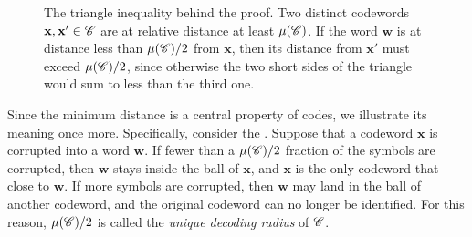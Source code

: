 \documentclass[../../book]{subfiles}
\begin{document}
\begin{figure}[ht]
    \centering
    \caption{The triangle inequality behind the proof. Two distinct codewords $\mathbf{x}, \mathbf{x}' \in \mathscr{C}$ are at relative distance at least $\mu(\mathscr{C})$. If the word $\mathbf{w}$ is at distance less than $\mu(\mathscr{C})/2$ from $\mathbf{x}$, then its distance from $\mathbf{x}'$ must exceed $\mu(\mathscr{C})/2$, since otherwise the two short sides of the triangle would sum to less than the third one.}
    \label{fig:unique-decoding-proof}
\end{figure}

Since the minimum distance is a central property of codes, we illustrate its meaning once more. 
Specifically, consider the .
Suppose that a codeword $\mathbf{x}$ is corrupted into a word $\mathbf{w}$.
If fewer than a $\mu(\mathscr{C})/2$ fraction of the symbols are corrupted, then $\mathbf{w}$ stays inside the ball of $\mathbf{x}$, and $\mathbf{x}$ is the only codeword that close to $\mathbf{w}$.
If more symbols are corrupted, then $\mathbf{w}$ may land in the ball of another codeword, and the original codeword can no longer be identified.
For this reason, $\mu(\mathscr{C})/2$ is called the \emph{unique decoding radius} of $\mathscr{C}$.
\end{document}
